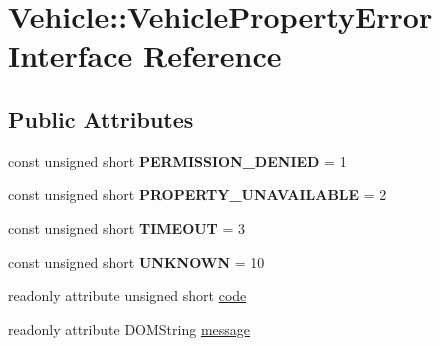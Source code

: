 \hypertarget{interfaceVehicle_1_1VehiclePropertyError}{\section{Vehicle\-:\-:Vehicle\-Property\-Error Interface Reference}
\label{interfaceVehicle_1_1VehiclePropertyError}
}
\subsection*{Public Attributes}
\begin{DoxyCompactItemize}
\item 
\hypertarget{interfaceVehicle_1_1VehiclePropertyError_a9e1d28bae3166dbc41deb98a5d310143}{const unsigned short {\bfseries P\-E\-R\-M\-I\-S\-S\-I\-O\-N\-\_\-\-D\-E\-N\-I\-E\-D} = 1}\label{interfaceVehicle_1_1VehiclePropertyError_a9e1d28bae3166dbc41deb98a5d310143}

\item 
\hypertarget{interfaceVehicle_1_1VehiclePropertyError_aad7c722164eef737507909f381bc6a3d}{const unsigned short {\bfseries P\-R\-O\-P\-E\-R\-T\-Y\-\_\-\-U\-N\-A\-V\-A\-I\-L\-A\-B\-L\-E} = 2}\label{interfaceVehicle_1_1VehiclePropertyError_aad7c722164eef737507909f381bc6a3d}

\item 
\hypertarget{interfaceVehicle_1_1VehiclePropertyError_a8d6663888cce47e082be19f98f9f998e}{const unsigned short {\bfseries T\-I\-M\-E\-O\-U\-T} = 3}\label{interfaceVehicle_1_1VehiclePropertyError_a8d6663888cce47e082be19f98f9f998e}

\item 
\hypertarget{interfaceVehicle_1_1VehiclePropertyError_a4040901287b52f6d4a59cc83fd3bb195}{const unsigned short {\bfseries U\-N\-K\-N\-O\-W\-N} = 10}\label{interfaceVehicle_1_1VehiclePropertyError_a4040901287b52f6d4a59cc83fd3bb195}

\item 
readonly attribute unsigned short \hyperlink{interfaceVehicle_1_1VehiclePropertyError_a9fe467c714951d08485d5aadc8fc7482}{code}
\item 
readonly attribute D\-O\-M\-String \hyperlink{interfaceVehicle_1_1VehiclePropertyError_a4d61bb9cbb51d5519508198fa7f9f122}{message}
\end{DoxyCompactItemize}


